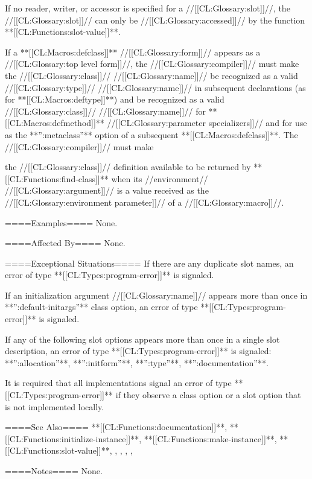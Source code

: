 If no reader, writer, or accessor is specified for a //[[CL:Glossary:slot]]//, the //[[CL:Glossary:slot]]// can only be //[[CL:Glossary:accessed]]// by the function **[[CL:Functions:slot-value]]**.

If a **[[CL:Macros:defclass]]** //[[CL:Glossary:form]]// appears as a //[[CL:Glossary:top level form]]//, the //[[CL:Glossary:compiler]]// must make the //[[CL:Glossary:class]]// //[[CL:Glossary:name]]// be recognized as a valid //[[CL:Glossary:type]]// //[[CL:Glossary:name]]// in subsequent declarations (as for **[[CL:Macros:deftype]]**) and be recognized as a valid //[[CL:Glossary:class]]// //[[CL:Glossary:name]]// for **[[CL:Macros:defmethod]]** //[[CL:Glossary:parameter specializers]]// and for use as the **'':metaclass''** option of a subsequent **[[CL:Macros:defclass]]**. The //[[CL:Glossary:compiler]]// must make

the //[[CL:Glossary:class]]// definition available to be returned by **[[CL:Functions:find-class]]** when its //environment// //[[CL:Glossary:argument]]// is a value received as the //[[CL:Glossary:environment parameter]]// of a //[[CL:Glossary:macro]]//.

====Examples====
None.

====Affected By====
None.

====Exceptional Situations====
If there are any duplicate slot names, an error of type **[[CL:Types:program-error]]** is signaled.

If an initialization argument //[[CL:Glossary:name]]// appears more than once in **'':default-initargs''** class option, an error of type **[[CL:Types:program-error]]** is signaled.

If any of the following slot options appears more than once in a single slot description, an error of type **[[CL:Types:program-error]]** is signaled: **'':allocation''**, **'':initform''**, **'':type''**, **'':documentation''**.

It is required that all implementations signal an error of type **[[CL:Types:program-error]]** if they observe a class option or a slot option that is not implemented locally.

====See Also====
**[[CL:Functions:documentation]]**, **[[CL:Functions:initialize-instance]]**, **[[CL:Functions:make-instance]]**, **[[CL:Functions:slot-value]]**, {\secref\Classes}, {\secref\Inheritance}, {\secref\ClassReDef}, {\secref\DeterminingtheCPL}, {\secref\ObjectCreationAndInit}

====Notes====
None.

 

